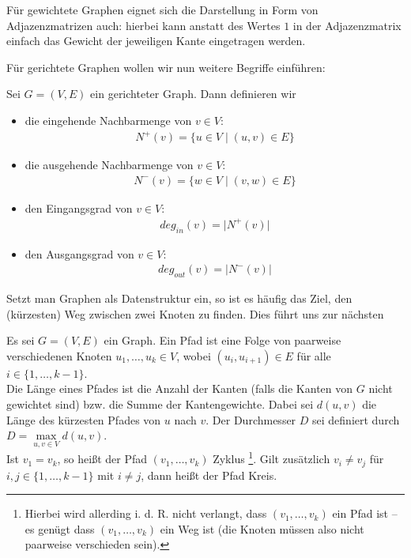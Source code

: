 Für gewichtete Graphen eignet sich die Darstellung in Form von
Adjazenzmatrizen auch: hierbei kann anstatt des Wertes $1$ in der
Adjazenzmatrix einfach das Gewicht der jeweiligen Kante eingetragen
werden.

Für gerichtete Graphen wollen wir nun weitere Begriffe einführen:

\begin{defi}
  Sei $G=(V,E)$ ein gerichteter Graph. Dann definieren wir
  \begin{itemize}
  \item die eingehende Nachbarmenge von $v \in V$:
    \begin{gather*}
      N^{+}(v) = \{u \in V \mid (u,v) \in E \}
    \end{gather*}

  \item die ausgehende Nachbarmenge von $v \in V$:
    \begin{gather*}
      N^{-}(v) = \{w \in V \mid (v,w) \in E \}
    \end{gather*}

  \item den Eingangsgrad von $v \in V$:
    \begin{gather*}
      deg_{in}(v) = \big| N^{+}(v) \big|
    \end{gather*}

  \item den Ausgangsgrad von $v \in V$:
    \begin{gather*}
      deg_{out}(v) = \big| N^{-}(v) \big|
    \end{gather*}
  \end{itemize}
\end{defi}

Setzt man Graphen als Datenstruktur ein, so ist es häufig das Ziel,
den (kürzesten) Weg zwischen zwei Knoten zu finden. Dies führt uns zur
nächsten

\begin{defi}[Pfade]
  Es sei $G=(V,E)$ ein Graph. Ein Pfad ist eine Folge von paarweise verschiedenen Knoten $u_1, \dots, u_k \in V$, wobei $(u_i, u_{i+1}) \in E$ für alle $i \in \{1, \dots, k-1\}$. \\

  Die Länge eines Pfades ist die Anzahl der Kanten (falls die Kanten von $G$ nicht gewichtet sind) bzw. die Summe der Kantengewichte. Dabei sei $d(u,v)$ die Länge des kürzesten Pfades von $u$ nach $v$. Der Durchmesser $D$ sei definiert durch $D = \underset{u,v \in V}{\max}{d(u,v)}$. \\

  Ist $v_1 = v_k$, so heißt der Pfad $(v_1, \dots, v_k)$ Zyklus
  \footnote{Hierbei wird allerding i. d. R. nicht verlangt, dass
    $(v_1, \dots, v_k)$ ein Pfad ist -- es genügt dass
    $(v_1, \dots, v_k)$ ein Weg ist (die Knoten müssen also nicht
    paarweise verschieden sein).}. Gilt zusätzlich $v_i \neq v_j$ für
  $i,j \in \{1, \dots, k-1\}$ mit $i \neq j$, dann heißt der Pfad
  Kreis.
\end{defi}

